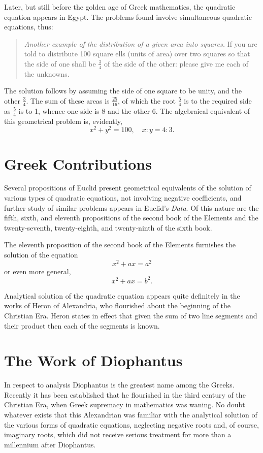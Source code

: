 \documentclass[11pt,a4paper]{book}
\begin{document}
Later, but still before the golden age of Greek mathematics, the quadratic equation appears in Egypt. The problems found involve simultaneous quadratic equations, thus:

\begin{quote}
\textit{Another example of the distribution of a given area into squares.} If you are told to distribute 100 square ells (units of area) over two squares so that the side of one shall be $\frac{3}{4}$ of the side of the other: please give me each of the unknowns.
\end{quote}

The solution follows by assuming the side of one square to be unity, and the other $\frac{3}{4}$. The sum of these areas is $\frac{25}{16}$, of which the root $\frac{5}{4}$ is to the required side as $\frac{5}{4}$ is to 1, whence one side is 8 and the other 6. The algebraical equivalent of this geometrical problem is, evidently,
\[x^2 + y^2 = 100, \quad x : y = 4 : 3.\]

\section{Greek Contributions}

Several propositions of Euclid present geometrical equivalents of the solution of various types of quadratic equations, not involving negative coefficients, and further study of similar problems appears in Euclid's \textit{Data}. Of this nature are the fifth, sixth, and eleventh propositions of the second book of the Elements and the twenty-seventh, twenty-eighth, and twenty-ninth of the sixth book.

The eleventh proposition of the second book of the Elements furnishes the solution of the equation
\[x^2 + ax = a^2\]
or even more general,
\[x^2 + ax = b^2.\]

Analytical solution of the quadratic equation appears quite definitely in the works of Heron of Alexandria, who flourished about the beginning of the Christian Era. Heron states in effect that given the sum of two line segments and their product then each of the segments is known.

\section{The Work of Diophantus}

In respect to analysis Diophantus is the greatest name among the Greeks. Recently it has been established that he flourished in the third century of the Christian Era, when Greek supremacy in mathematics was waning. No doubt whatever exists that this Alexandrian was familiar with the analytical solution of the various forms of quadratic equations, neglecting negative roots and, of course, imaginary roots, which did not receive serious treatment for more than a millennium after Diophantus.
\end{document}
